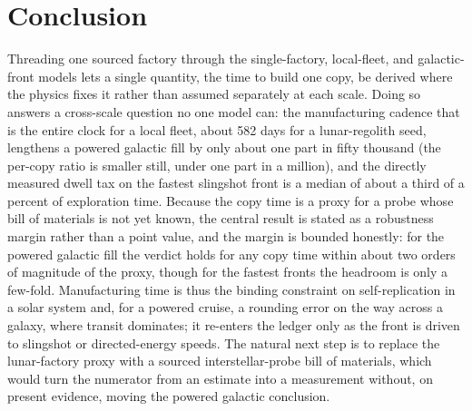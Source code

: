 \section{Conclusion}

Threading one sourced factory through the single-factory, local-fleet, and galactic-front
models lets a single quantity, the time to build one copy, be derived where the physics fixes
it rather than assumed separately at each scale. Doing so answers a cross-scale question no one
model can: the manufacturing cadence that is the entire clock for a local fleet, about 582 days
for a lunar-regolith seed, lengthens a powered galactic fill by only about one part in fifty
thousand (the per-copy ratio is smaller still, under one part in a million), and the directly
measured dwell tax on the fastest slingshot front is a median of about a third of a percent of
exploration time. Because the copy time is a proxy for a probe whose bill of materials is not
yet known, the central result is stated as a robustness margin rather than a point value, and
the margin is bounded honestly: for the powered galactic fill the verdict holds for any copy
time within about two orders of magnitude of the proxy, though for the fastest fronts the
headroom is only a few-fold. Manufacturing time is thus the binding constraint on
self-replication in a solar system and, for a powered cruise, a rounding error on the way across
a galaxy, where transit dominates; it re-enters the ledger only as the front is driven to
slingshot or directed-energy speeds. The natural next step is to replace the lunar-factory proxy
with a sourced interstellar-probe bill of materials, which would turn the numerator from an
estimate into a measurement without, on present evidence, moving the powered galactic
conclusion.
